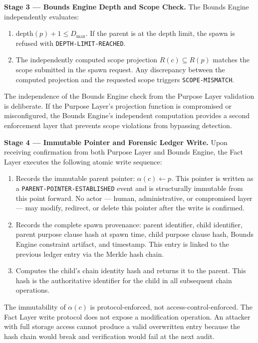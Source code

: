 \bigskip
\noindent\textbf{Stage 3 — Bounds Engine Depth and Scope Check.} The Bounds Engine independently evaluates:

\begin{enumerate}
  \item[(BE-V1)] $\mathrm{depth}(p) + 1 \leq D_{\max}$. If the parent is at the depth limit, the spawn is refused with \texttt{DEPTH-LIMIT-REACHED}.
  \item[(BE-V2)] The independently computed scope projection $R(c) \subseteq R(p)$ matches the scope submitted in the spawn request. Any discrepancy between the computed projection and the requested scope triggers \texttt{SCOPE-MISMATCH}.
\end{enumerate}

The independence of the Bounds Engine check from the Purpose Layer validation is deliberate. If the Purpose Layer's projection function is compromised or misconfigured, the Bounds Engine's independent computation provides a second enforcement layer that prevents scope violations from bypassing detection.

\bigskip
\noindent\textbf{Stage 4 — Immutable Pointer and Forensic Ledger Write.} Upon receiving confirmation from both Purpose Layer and Bounds Engine, the Fact Layer executes the following atomic write sequence:

\begin{enumerate}
  \item[(FL-W1)] Records the immutable parent pointer: $\alpha(c) \gets p$. This pointer is written as a \texttt{PARENT-POINTER-ESTABLISHED} event and is structurally immutable from this point forward. No actor — human, administrative, or compromised layer — may modify, redirect, or delete this pointer after the write is confirmed.
  \item[(FL-W2)] Records the complete spawn provenance: parent identifier, child identifier, parent purpose clause hash at spawn time, child purpose clause hash, Bounds Engine constraint artifact, and timestamp. This entry is linked to the previous ledger entry via the Merkle hash chain.
  \item[(FL-W3)] Computes the child's chain identity hash and returns it to the parent. This hash is the authoritative identifier for the child in all subsequent chain operations.
\end{enumerate}

The immutability of $\alpha(c)$ is protocol-enforced, not access-control-enforced. The Fact Layer write protocol does not expose a modification operation. An attacker with full storage access cannot produce a valid overwritten entry because the hash chain would break and verification would fail at the next audit.

